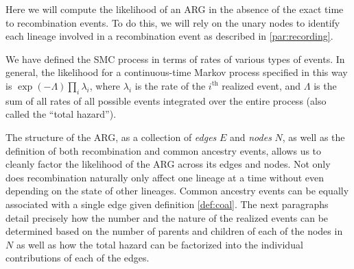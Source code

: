 \documentclass{article}
\newcommand{\comment}[1]{{\it \color{orange} (#1)}}
\begin{document}
Here we will compute the likelihood of an ARG in the absence of the
exact time to recombination events. To do this, we will rely on the unary nodes
to identify each lineage involved in a recombination event as described in \ref{par:recording}.

We have defined the SMC process in terms of rates of various types of events.
In general, the likelihood for a continuous-time Markov process specified in this way
is $\exp(-\Lambda) \prod_i \lambda_i$,
where $\lambda_i$ is the rate of the $i^\text{th}$ realized event,
and $\Lambda$ is the sum of all rates of all possible events
integrated over the entire process
(also called the ``total hazard''). 




The structure of the ARG, as a collection of \emph{edges} $E$ and \emph{nodes} $N$,
as well as the definition of both recombination and common ancestry events, allows us
to cleanly factor the likelihood of the ARG across its edges and nodes.
Not only does recombination
naturally only affect one lineage at a time without even depending
on the state of other lineages. Common ancestry events can be equally
associated with a single edge given definition \eqref{def:coal}.
The next paragraphs detail precisely how the number and the nature of the realized events
can be determined based on the number of
parents and children of each of the nodes in $N$ as well as how the total hazard can be
factorized into the individual contributions of each of the edges.
\end{document}
